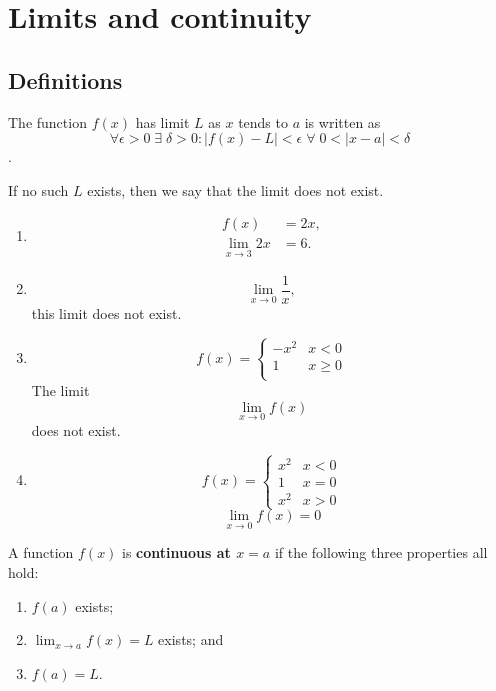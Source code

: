 \chapter{Limits and continuity}

\section{Definitions}

\begin{definition}
    The function $f(x)$ has limit $L$ as $x$ tends to $a$ is written as
    \[\forall\epsilon>0\;\exists\;\delta>0:|f(x)-L|<\epsilon\;\forall\;0<|x-a|<\delta\].
    
    If no such $L$ exists, then we say that the limit does not exist.
\end{definition}

\begin{example}
    \begin{enumerate}
        \item 
        \begin{align*}
            f(x)&=2x,\\
            \lim_{x\to3}{2x}&=6.
        \end{align*}
        
        \item \[\lim_{x\to0}{\dfrac1x},\] this limit does not exist.
        
        \item 
        \[
            f(x)=
            \begin{cases}
                -x^2 & x<0\\
                1 & x\geq0\\
            \end{cases}
        \]
        The limit \[\lim_{x\to0}{f(x)}\] does not exist.
        
        \item
        \[
            f(x)=
            \begin{cases}
                x^2 & x<0\\
                1 & x=0\\
                x^2 & x>0
            \end{cases}
        \]
        \[\lim_{x\to0}{f(x)}=0\]
    \end{enumerate}
\end{example}

\begin{definition}
    A function $f(x)$ is \textbf{continuous at $x=a$} if the following three properties all hold:
    \begin{enumerate}
        \item $f(a)$ exists;
        \item $\lim_{x\to a}{f(x)}=L$ exists; and
        \item $f(a)=L$.
    \end{enumerate}
\end{definition}

